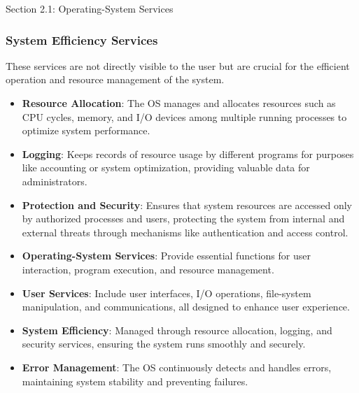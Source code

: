 \begin{notes}{Section 2.1: Operating-System Services}
\begin{highlight}
    \end{highlight}
    
    \subsubsection*{System Efficiency Services}
    
    These services are not directly visible to the user but are crucial for the efficient operation and resource management of the system.
    
    \begin{highlight}
    
    \begin{itemize}
        \item \textbf{Resource Allocation}: The OS manages and allocates resources such as CPU cycles, memory, and I/O devices among multiple running processes to optimize system performance.
        \item \textbf{Logging}: Keeps records of resource usage by different programs for purposes like accounting or system optimization, providing valuable data for administrators.
        \item \textbf{Protection and Security}: Ensures that system resources are accessed only by authorized processes and users, protecting the system from internal and external threats through 
        mechanisms like authentication and access control.
    \end{itemize}
    
    \end{highlight}
    
    \begin{highlight}
    
    \begin{itemize}
        \item \textbf{Operating-System Services}: Provide essential functions for user interaction, program execution, and resource management.
        \item \textbf{User Services}: Include user interfaces, I/O operations, file-system manipulation, and communications, all designed to enhance user experience.
        \item \textbf{System Efficiency}: Managed through resource allocation, logging, and security services, ensuring the system runs smoothly and securely.
        \item \textbf{Error Management}: The OS continuously detects and handles errors, maintaining system stability and preventing failures.
    \end{itemize}
    
    \end{highlight}
\end{notes}


